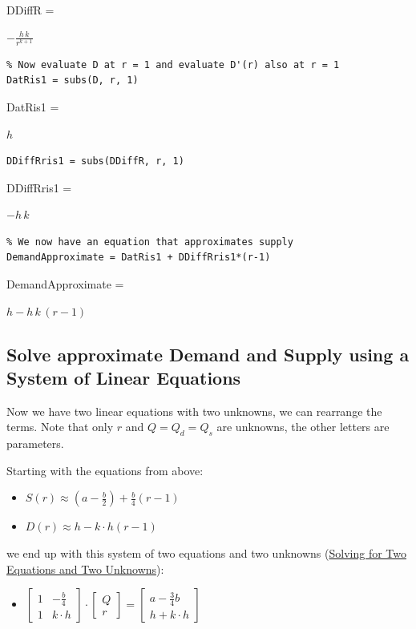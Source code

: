 \documentclass[
]{book}
\providecommand{\tightlist}{%
  \setlength{\itemsep}{0pt}\setlength{\parskip}{0pt}}
\begin{document}
DDiffR =

\(\displaystyle -\frac{h\,k}{r^{k+1} }\)

\begin{verbatim}
% Now evaluate D at r = 1 and evaluate D'(r) also at r = 1
DatRis1 = subs(D, r, 1)
\end{verbatim}

DatRis1 =

\(\displaystyle h\)

\begin{verbatim}
DDiffRris1 = subs(DDiffR, r, 1)
\end{verbatim}

DDiffRris1 =

\(\displaystyle -h\,k\)

\begin{verbatim}
% We now have an equation that approximates supply
DemandApproximate = DatRis1 + DDiffRris1*(r-1)
\end{verbatim}

DemandApproximate =

\(\displaystyle h-h\,k\,{\left(r-1\right)}\)

\hypertarget{solve-approximate-demand-and-supply-using-a-system-of-linear-equations}{%
\subsection{Solve approximate Demand and Supply using a System of Linear Equations}\label{solve-approximate-demand-and-supply-using-a-system-of-linear-equations}}

Now we have two linear equations with two unknowns, we can rearrange the
terms. Note that only \(r\) and \(Q=Q_d =Q_s\) are unknowns, the other
letters are parameters.

Starting with the equations from above:

\begin{itemize}
\item
  \(\displaystyle S(r)\approx (a-\frac{b}{2})+\frac{b}{4}(r-1)\)
\item
  \(\displaystyle D(r)\approx h-k\cdot h(r-1)\)
\end{itemize}

we end up with this system of two equations and two unknowns (\href{https://math4econ.github.io/matrix_system_of_equations/matrix_linear_system_2.html}{Solving
for Two Equations and Two
Unknowns}):

\begin{itemize}
\tightlist
\item
  \(\displaystyle \left\lbrack \begin{array}{cc} 1 & -\frac{b}{4}\\ 1 & k\cdot h \end{array}\right\rbrack \cdot \left\lbrack \begin{array}{c} Q\\ r \end{array}\right\rbrack =\left\lbrack \begin{array}{c} a-\frac{3}{4}b\\ h+k\cdot h \end{array}\right\rbrack\)
\end{itemize}
\end{document}
